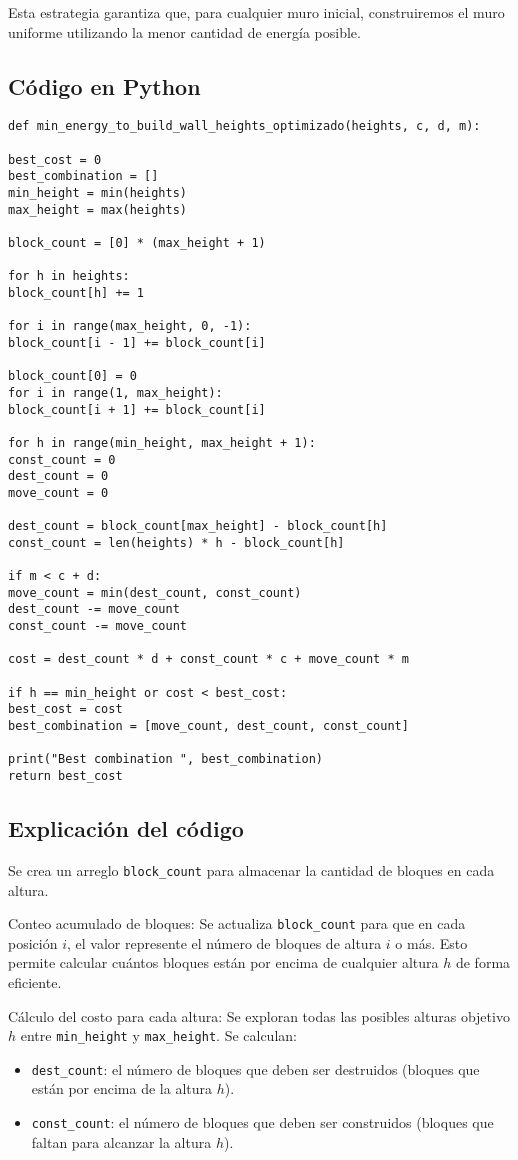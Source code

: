 \documentclass[a4paper,12pt]{article}
\begin{document}
Esta estrategia garantiza que, para cualquier muro inicial, construiremos el muro uniforme utilizando la menor cantidad de energía posible.

\subsection{Código en Python}
\begin{verbatim}
def min_energy_to_build_wall_heights_optimizado(heights, c, d, m):

best_cost = 0
best_combination = []
min_height = min(heights)
max_height = max(heights)

block_count = [0] * (max_height + 1)

for h in heights:
block_count[h] += 1

for i in range(max_height, 0, -1):
block_count[i - 1] += block_count[i]

block_count[0] = 0
for i in range(1, max_height):
block_count[i + 1] += block_count[i]

for h in range(min_height, max_height + 1):
const_count = 0
dest_count = 0
move_count = 0

dest_count = block_count[max_height] - block_count[h]
const_count = len(heights) * h - block_count[h]

if m < c + d:
move_count = min(dest_count, const_count)
dest_count -= move_count
const_count -= move_count

cost = dest_count * d + const_count * c + move_count * m

if h == min_height or cost < best_cost:
best_cost = cost
best_combination = [move_count, dest_count, const_count]

print("Best combination ", best_combination)
return best_cost
\end{verbatim}

\subsection{Explicación del código}
	
Se crea un arreglo \texttt{block\_count} para almacenar la cantidad de bloques en cada altura.

Conteo acumulado de bloques: Se actualiza \texttt{block\_count} para que en cada posición \(i\), el valor represente el número de bloques de altura \(i\) o más. Esto permite calcular cuántos bloques están por encima de cualquier altura \(h\) de forma eficiente.

Cálculo del costo para cada altura: Se exploran todas las posibles alturas objetivo \(h\) entre \texttt{min\_height} y \texttt{max\_height}. Se calculan:
\begin{itemize}
	\item \texttt{dest\_count}: el número de bloques que deben ser destruidos (bloques que están por encima de la altura \(h\)).
	\item \texttt{const\_count}: el número de bloques que deben ser construidos (bloques que faltan para alcanzar la altura \(h\)).
\end{itemize}
\end{document}
